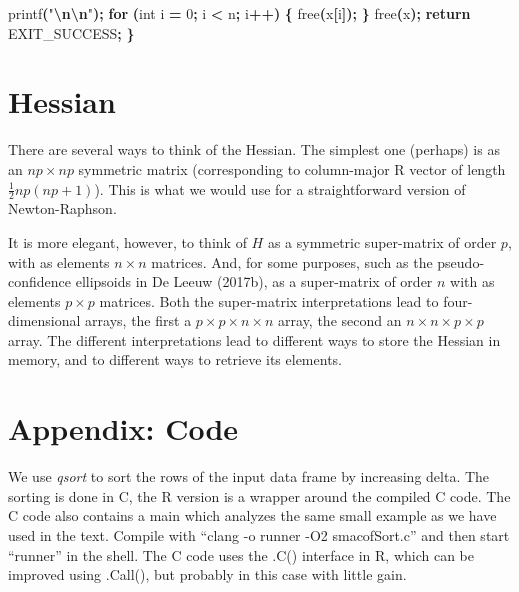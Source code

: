 \documentclass[
  12pt,
]{article}
\newenvironment{Shaded}{\begin{snugshade}}{\end{snugshade}}
\newcommand{\ControlFlowTok}[1]{\textcolor[rgb]{0.13,0.29,0.53}{\textbf{#1}}}
\newcommand{\DataTypeTok}[1]{\textcolor[rgb]{0.13,0.29,0.53}{#1}}
\newcommand{\DecValTok}[1]{\textcolor[rgb]{0.00,0.00,0.81}{#1}}
\newcommand{\NormalTok}[1]{#1}
\newcommand{\OperatorTok}[1]{\textcolor[rgb]{0.81,0.36,0.00}{\textbf{#1}}}
\newcommand{\SpecialCharTok}[1]{\textcolor[rgb]{0.81,0.36,0.00}{\textbf{#1}}}
\newcommand{\StringTok}[1]{\textcolor[rgb]{0.31,0.60,0.02}{#1}}
\begin{document}
\begin{Shaded}
\begin{Highlighting}[]
\NormalTok{  printf}\OperatorTok{(}\StringTok{"}\SpecialCharTok{\textbackslash{}n\textbackslash{}n}\StringTok{"}\OperatorTok{);}
  \ControlFlowTok{for} \OperatorTok{(}\DataTypeTok{int}\NormalTok{ i }\OperatorTok{=} \DecValTok{0}\OperatorTok{;}\NormalTok{ i }\OperatorTok{\textless{}}\NormalTok{ n}\OperatorTok{;}\NormalTok{ i}\OperatorTok{++)} \OperatorTok{\{}
\NormalTok{    free}\OperatorTok{(}\NormalTok{x}\OperatorTok{[}\NormalTok{i}\OperatorTok{]);}
  \OperatorTok{\}}
\NormalTok{  free}\OperatorTok{(}\NormalTok{x}\OperatorTok{);}
  \ControlFlowTok{return}\NormalTok{ EXIT\_SUCCESS}\OperatorTok{;}
\OperatorTok{\}}
\end{Highlighting}
\end{Shaded}

\section{Hessian}\label{hessian}

There are several ways to think of the Hessian. The simplest one (perhaps) is
as an \(np\times np\) symmetric matrix (corresponding to column-major R vector
of length \(\frac12 np(np+1)\)). This is what we would use for a straightforward
version of Newton-Raphson.

It is more elegant, however, to think of
\(H\) as a symmetric super-matrix of order \(p\), with as elements \(n\times n\)
matrices. And, for some purposes, such as the pseudo-confidence ellipsoids in De Leeuw (2017b), as
a super-matrix of order \(n\) with as elements \(p\times p\) matrices. Both the
super-matrix interpretations lead to four-dimensional arrays, the first
a \(p\times p\times n\times n\) array, the second an \(n\times n\times p\times p\)
array. The different interpretations lead to different ways to store the
Hessian in memory, and to different ways to retrieve its elements.

\section{Appendix: Code}\label{appendix-code}

We use \emph{qsort} to sort the rows of the input data frame by increasing delta. The sorting
is done in C, the R version is a wrapper around the compiled C code. The C code also
contains a main which analyzes the same small example as we have used in the text.
Compile with ``clang -o runner -O2 smacofSort.c'' and then start ``runner'' in the shell.
The C code uses the .C() interface in R, which can be improved using .Call(),
but probably in this case with little gain.
\end{document}

